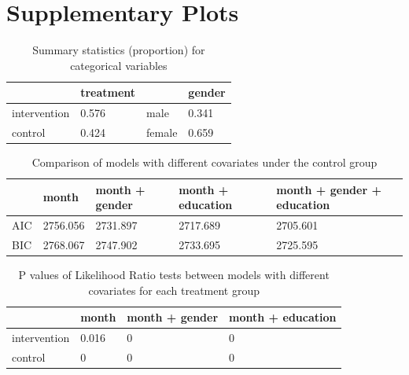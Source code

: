 

\section{Supplementary Plots}

\begin{table}[H]
\centering
\begin{tabular}{|l|l|l|l|}
\hline
& treatment & & gender\\
\hline
intervention & 0.576 & male & 0.341 \\
\hline
control & 0.424 & female & 0.659\\
\hline
\end{tabular}
\caption{Summary statistics (proportion) for categorical variables}
\label{tab:summ.stat.cat}
\end{table}

\begin{table}[H]
\centering
\begin{tabular}{|l|l|l|l|l|}
\hline
& month & month + gender & month + education & month + gender + education \\
\hline
AIC & 2756.056 & 2731.897 & 2717.689 & 2705.601 \\
\hline
BIC & 2768.067 & 2747.902 & 2733.695 & 2725.595 \\
\hline
\end{tabular}
\caption{Comparison of models with different covariates under the control group}
\label{tab:model.comp.control}
\end{table}

\begin{table}[H]
\centering
\begin{tabular}{|l|l|l|l|}
\hline
& month & month + gender & month + education \\
\hline
intervention & 0.016 & 0 & 0 \\
\hline
control & 0 & 0 & 0 \\
\hline
\end{tabular}
\caption{P values of Likelihood Ratio tests between models with different covariates for each treatment group}
\label{tab:model.comp.sep.lrt}
\end{table}

